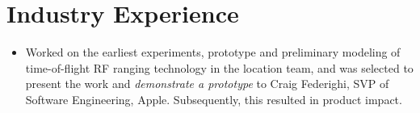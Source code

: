 \documentclass[11pt,a4paper,sans]{moderncv} %
\begin{document}






\section{Industry Experience}
{\begin{itemize} 
\item %
Worked on the earliest experiments, prototype and preliminary modeling of time-of-flight RF ranging technology in the location team, and was selected to present the work and \emph{demonstrate a prototype} to Craig Federighi, SVP of Software Engineering, Apple. Subsequently, this resulted in product impact.
\end{itemize}}
\end{document}
